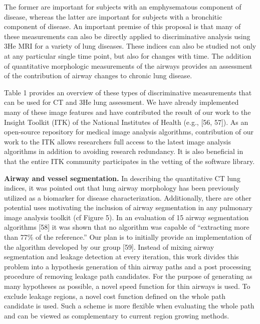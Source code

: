 \documentclass[11pt,]{article}
\begin{document}
The former are important for subjects with an emphysematous component of
disease, whereas the latter are important for subjects with a bronchitic
component of disease. An important premise of this proposal is that many
of these measurements can also be directly applied to discriminative
analysis using 3He MRI for a variety of lung diseases. These indices can
also be studied not only at any particular single time point, but also
for changes with time. The addition of quantitative morphologic
measurements of the airways provides an assessment of the contribution
of airway changes to chronic lung disease.



Table 1 provides an overview of these types of discriminative
measurements that can be used for CT and 3He lung assessment. We have
already implemented many of these image features and have contributed
the result of our work to the Insight Toolkit (ITK) of the National
Institutes of Health (e.g., {[}56, 57{]}). As an open-source repository
for medical image analysis algorithms, contribution of our work to the
ITK allows researchers full access to the latest image analysis
algorithms in addition to avoiding research redundancy. It is also
beneficial in that the entire ITK community participates in the vetting
of the software library.

\textbf{Airway and vessel segmentation.} In describing the quantitative
CT lung indices, it was pointed out that lung airway morphology has been
previously utilized as a biomarker for disease characterization.
Additionally, there are other potential uses motivating the inclusion of
airway segmentation in any pulmonary image analysis toolkit (cf Figure
5). In an evaluation of 15 airway segmentation algorithms {[}58{]} it
was shown that no algorithm was capable of ``extracting more than 77\%
of the reference.'' Our plan is to initially provide an implementation
of the algorithm developed by our group {[}59{]}. Instead of mixing
airway segmentation and leakage detection at every iteration, this work
divides this problem into a hypothesis generation of thin airway paths
and a post processing procedure of removing leakage path candidates. For
the purpose of generating as many hypotheses as possible, a novel speed
function for thin airways is used. To exclude leakage regions, a novel
cost function defined on the whole path candidate is used. Such a scheme
is more flexible when evaluating the whole path and can be viewed as
complementary to current region growing methods.
\end{document}
